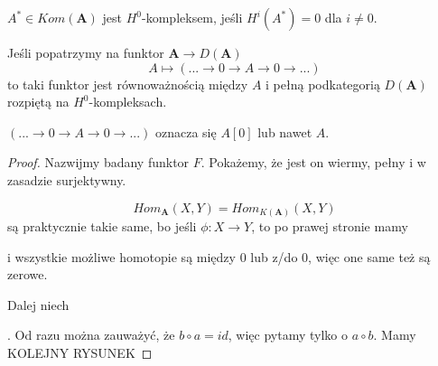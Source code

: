 \begin{definition}
  $A^*\in Kom(\mathbf{A})$ jest $H^0$-kompleksem, jeśli $H^i(A^*)=0$ dla $i\neq 0$.
\end{definition}

\begin{fact}
  Jeśli popatrzymy na funktor $\mathbf{A}\to D(\mathbf{A})$
  $$A\mapsto (...\to 0\to A\to 0\to ...)$$
  to taki funktor jest równoważnością między $A$ i pełną podkategorią $D(\mathbf{A})$ rozpiętą na $H^0$-kompleksach.
\end{fact}

$(...\to0\to A\to0\to...)$ oznacza się $A[0]$ lub nawet $A$.

\begin{proof}
  Nazwijmy badany funktor $F$. Pokażemy, że jest on wiermy, pełny i w zasadzie surjektywny.

  $$Hom_{\mathbf{A}}(X, Y)=Hom_{K(\mathbf{A})}(X, Y)$$
  są praktycznie takie same, bo jeśli $\phi: X\to Y$, to po prawej stronie mamy
  \begin{center}\end{center}
  i wszystkie możliwe homotopie są między $0$ lub z/do $0$, więc one same też są zerowe.

  Dalej niech . Od razu można zauważyć, że $b\circ a=id$, więc pytamy tylko o $a\circ b$. Mamy 
  {\large\color{red}KOLEJNY RYSUNEK}
\end{proof}

